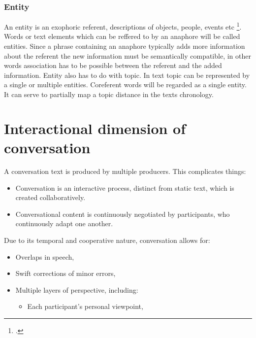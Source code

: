 \documentclass[12pt]{report}
\begin{document}
{\subsubsection{Entity}
\par
    An entity is an exophoric referent, descriptions of objects, people, events etc \footcite{entities}.
    Words or text elements which can be reffered to by an anaphore will be called entities.
    Since a phrase containing an anaphore typically adds more information about the referent
    the new information must be semantically compatible,
    in other words association has to be possible between the referent and the added information.
    Entity also has to do with topic.
    In text topic can be represented by a single or multiple entities.
    Coreferent words will be regarded as a single entity.
    It can serve to partially map a topic distance in the texts chronology.

\section{Interactional dimension of conversation}
\par
A conversation text is produced by multiple producers.
This complicates things:

\begin{itemize}

    \item
    Conversation is an interactive process, distinct from static text, which is created collaboratively.

    \item
    Conversational content is continuously negotiated by participants, who continuously adapt one another.

\end{itemize}

Due to its temporal and cooperative nature, conversation allows for:
\begin{itemize}

    \item
    Overlaps in speech,

    \item
    Swift corrections of minor errors,

    \item
    Multiple layers of perspective, including:
        \begin{itemize}

            \item
            Each participant’s personal viewpoint,


\end{itemize}
\end{itemize}}
\end{document}
